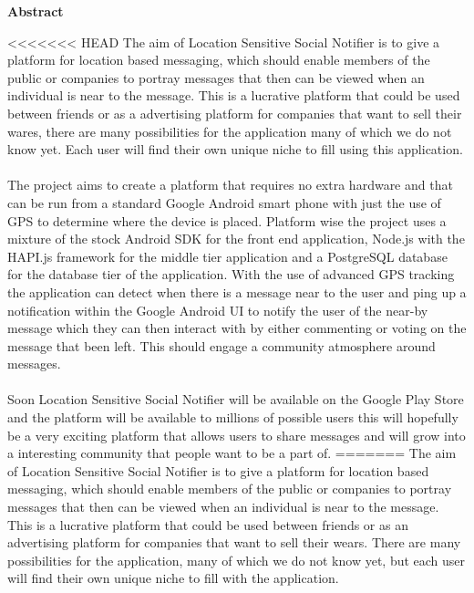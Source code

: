 \thispagestyle{empty}

\begin{center}
    {\LARGE\bf Abstract}
\end{center}

\noindent
<<<<<<< HEAD
The aim of Location Sensitive Social Notifier is to give a platform for location based messaging, which should enable members of the public or companies to portray messages that then can be viewed when an individual is near to the message. This is a lucrative platform that could be used between friends or as a advertising platform for companies that want to sell their wares, there are many possibilities for the application many of which we do not know yet.  Each user will find their own unique niche to fill using this application.\\
\\
The project aims to create a platform that requires no extra hardware and that can be run from a standard Google Android smart phone with just the use of GPS to determine where the device is placed. Platform wise the project uses a mixture of the stock Android SDK \cite{Google:androidAPIDocs:2015:online} for the front end application, Node.js\cite{nodeteam:node:2015:online} with the HAPI.js\cite{hapiteam:hapti:2015:online} framework for the middle tier application and a PostgreSQL\cite{Postgres:APIDocumentation:2015:online} database for the database tier of the application. With the use of advanced GPS tracking the application can detect when there is a message near to the user and ping up a notification within the Google Android UI to notify the user of the near-by message which they can then interact with by either commenting or voting on the message that been left.  This should engage a community atmosphere around messages.\\ 
\\
Soon Location Sensitive Social Notifier will be available on the Google Play Store and the platform will be available to millions of possible users this will hopefully be a very exciting platform that allows users to share messages and will grow into a interesting community that people want to be a part of.
=======
The aim of Location Sensitive Social Notifier is to give a platform for location based messaging, which should enable members of the public or companies to portray messages that then can be viewed when an individual is near to the message. This is a lucrative platform that could be used between friends or as an advertising platform for companies that want to sell their wears. There are many possibilities for the application, many of which we do not know yet, but each user will find their own unique niche to fill with the application.\\
